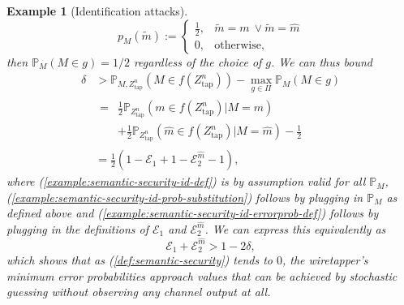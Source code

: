 \documentclass[journal]{IEEEtran}
\newcommand{\lemmaconst}{\delta}
\newcommand{\codebookpmf}{p}
\newcommand{\channelOut}{Z}
\newcommand{\channelOutWiretapper}{\channelOut_\mathrm{tap}}
\newcommand{\codebookBlocklength}{n}
\newcommand{\Probability}{\mathbb{P}}
\newcommand{\errorprob}{\mathcal{E}}
\newcommand{\messageRV}{M}
\newcommand{\messageAlphabetElement}{m}
\newcommand{\partition}{{\Pi}}
\newcommand{\wiretapperDecoder}{{f}}
\newcommand{\wiretapperGuesser}{{g}}
\newtheorem{example}{Example}
\begin{document}
\begin{example}[Identification attacks]
\[
\codebookpmf_\messageRV(\tilde{\messageAlphabetElement}) :=
\begin{cases}
\frac{1}{2}, & \tilde{\messageAlphabetElement} = \messageAlphabetElement\ \vee
               \tilde{\messageAlphabetElement} = \hat{\messageAlphabetElement}
\\
0,           & \text{otherwise,}
\end{cases}
\]
then $\Probability_{\messageRV}(\messageRV \in \wiretapperGuesser) = 1/2$ regardless of the choice of $\wiretapperGuesser$. We can thus bound
\begin{align}
\label{example:semantic-security-id-def}
\lemmaconst
&>
\Probability_{\messageRV, \channelOutWiretapper^\codebookBlocklength}(\messageRV \in \wiretapperDecoder(\channelOutWiretapper^\codebookBlocklength))
-
\max\limits_{\wiretapperGuesser \in \partition}
\Probability_{\messageRV}(\messageRV \in \wiretapperGuesser)
\\
\label{example:semantic-security-id-prob-substitution}
&
\begin{aligned}
=
&\frac{1}{2}
\Probability_{\channelOutWiretapper^\codebookBlocklength}(\messageAlphabetElement \in \wiretapperDecoder(\channelOutWiretapper^\codebookBlocklength) | \messageRV = \messageAlphabetElement)
\\
&+
\frac{1}{2}
\Probability_{\channelOutWiretapper^\codebookBlocklength}(\hat{\messageAlphabetElement} \in \wiretapperDecoder(\channelOutWiretapper^\codebookBlocklength) | \messageRV = \hat{\messageAlphabetElement})
-
\frac{1}{2}
\end{aligned}
\\
\label{example:semantic-security-id-errorprob-def}
&=
\frac{1}{2}(1-\errorprob_1 + 1-\errorprob_2^{\hat{\messageAlphabetElement}} - 1),
\end{align}
where (\ref{example:semantic-security-id-def}) is by assumption valid for all $\Probability_\messageRV$, (\ref{example:semantic-security-id-prob-substitution}) follows by plugging in $\Probability_\messageRV$ as defined above and (\ref{example:semantic-security-id-errorprob-def}) follows by plugging in the definitions of $\errorprob_1$ and $\errorprob_2^{\hat{\messageAlphabetElement}}$. We can express this equivalently as
\[
\errorprob_1 + \errorprob_2^{\hat{\messageAlphabetElement}} > 1 - 2\lemmaconst,
\]
which shows that as (\ref{def:semantic-security}) tends to $0$, the wiretapper's minimum error probabilities approach values that can be achieved by stochastic guessing without observing any channel output at all.
\end{example}
\end{document}
